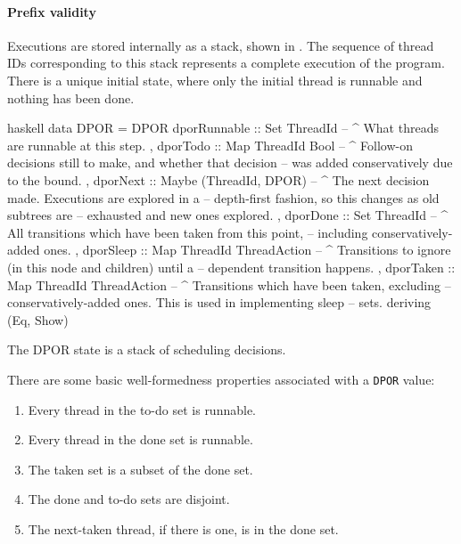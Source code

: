 \paragraph{Prefix validity}
Executions are stored internally as a stack, shown in .
The sequence of thread IDs corresponding to this stack represents a
complete execution of the program.  There is a unique initial state,
where only the initial thread is runnable and nothing has been done.

\begin{listing}
\centering
\begin{cminted}{haskell}
data DPOR = DPOR
  { dporRunnable :: Set ThreadId
  -- ^ What threads are runnable at this step.
  , dporTodo     :: Map ThreadId Bool
  -- ^ Follow-on decisions still to make, and whether that decision
  -- was added conservatively due to the bound.
  , dporNext     :: Maybe (ThreadId, DPOR)
  -- ^ The next decision made. Executions are explored in a
  -- depth-first fashion, so this changes as old subtrees are
  -- exhausted and new ones explored.
  , dporDone     :: Set ThreadId
  -- ^ All transitions which have been taken from this point,
  -- including conservatively-added ones.
  , dporSleep    :: Map ThreadId ThreadAction
  -- ^ Transitions to ignore (in this node and children) until a
  -- dependent transition happens.
  , dporTaken    :: Map ThreadId ThreadAction
  -- ^ Transitions which have been taken, excluding
  -- conservatively-added ones. This is used in implementing sleep
  -- sets.
  } deriving (Eq, Show)
\end{cminted}
\caption{The DPOR state is a stack of scheduling decisions.}\label{lst:dpor}
\end{listing}

There are some basic well-formedness properties associated with a
\verb|DPOR| value:

\vfill

\begin{enumerate}
\item Every thread in the to-do set is runnable.
\item Every thread in the done set is runnable.
\item The taken set is a subset of the done set.
\item The done and to-do sets are disjoint.
\item The next-taken thread, if there is one, is in the done set.
\end{enumerate}

